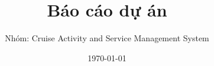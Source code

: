 \documentclass[a4paper,12pt]{book}
\begin{document}
\frontmatter
\title{Báo cáo dự án}
\author{Nhóm: Cruise Activity and Service Management System}
\date{\today}
\maketitle

\tableofcontents
\clearpage

\mainmatter







\clearpage


\end{document}
